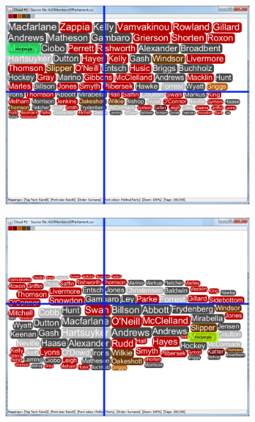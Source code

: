 \begin{figure}[!htb]
\centering
\begin{subfigure}{.5\textwidth}
  \centering
  \includegraphics[scale=0.25]{Experiment1/Trial1/C1S2L2.png}
\end{subfigure}%
\begin{subfigure}{.5\textwidth}
  \centering
  \includegraphics[scale=0.25]{Experiment1/Trial1/C1S2L1.png}
\end{subfigure}
\begin{subfigure}{.5\textwidth}
  \centering

\end{subfigure}
\end{figure}
